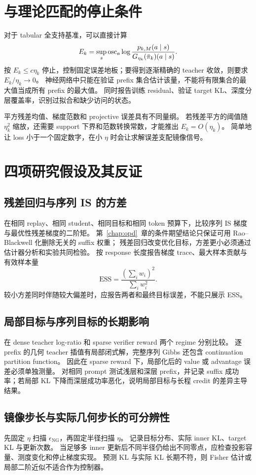 \section{与理论匹配的停止条件}
对于 tabular 全支持基准，可以直接计算
\[
 E_k=\sup_s\operatorname{osc}_a\log\frac{p_{k,M}(a\mid s)}{G_{\eta_k}(\bar\pi_k)(a\mid s)}.
\]
按 $E_k\le c\eta_k$ 停止，控制固定误差地板；要得到逐渐精确的 teacher 收敛，则要求 $E_k/\eta_k\to0$。
神经网络中只能在验证 prefix 集合估计该量，不能将有限集合的最大值当成所有 prefix 的最大值。
同时报告训练 residual、验证 target KL、深度分层覆盖率，识别过拟合和缺少访问的状态。

平方残差均值、梯度范数和 projective 误差具有不同量纲。
若残差平方的阈值随 $\eta_k^2$ 缩放，还需要 support 下界和范数转换常数，才能推出 $E_k=O(\eta_k)$。
简单地让 loss 小于一个固定数字，在小 $\eta$ 时会让求解误差支配镜像信号。

\section{四项研究假设及其反证}
\subsection{残差回归与序列 IS 的方差}
在相同 replay、相同 student、相同目标和相同 token 预算下，比较序列 IS 梯度与最优性残差梯度的二阶矩。
第~\ref{chap:opd}~章的条件期望结论只保证可用 Rao--Blackwell 化删除无关的 suffix 权重；
残差回归改变优化目标，方差更小必须通过估计器分析和实验共同检验。
按 response 长度报告梯度 trace、最大样本贡献与有效样本量
\[
 \mathrm{ESS}=\frac{(\sum_i w_i)^2}{\sum_i w_i^2}.
\]
较小方差同时伴随较大偏差时，应报告两者和最终目标误差，不能只展示 ESS。

\subsection{局部目标与序列目标的长期影响}
在 dense teacher log-ratio 和 sparse verifier reward 两个 regime 分别比较。
逐 prefix 的几何 teacher 插值有局部闭式解，完整序列 Gibbs 还包含 continuation partition function。
因此在 sparse reward 下，局部化后的 value 或 advantage 误差必须单独测量。
对相同 prompt 测试浅层和深层 prefix，并记录 suffix 成功率；若局部 KL 下降而深层成功率恶化，说明局部目标与长程 credit 的差异主导结果。

\subsection{镜像步长与实际几何步长的可分辨性}
先固定 $\eta$ 扫描 $\epsilon_{\mathrm{NG}}$，再固定半径扫描 $\eta$。
记录目标分布、实际 inner KL、target KL 与更新次数。
当足够多 inner 更新后不同半径仍给出不同零点，应检查投影容量、测度变化和停止梯度实现。
预测 KL 与实际 KL 长期不符，则 Fisher 估计或局部二阶近似不适合作为控制器。

